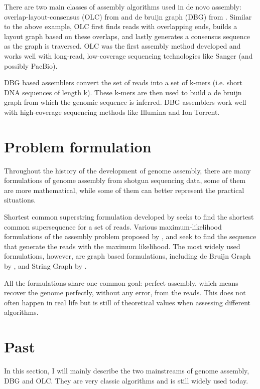 \documentclass{bioinfo}
\begin{document}
There are two main classes of assembly algorithms used in de novo assembly:  overlap-layout-consensus (OLC) from \cite{myers2005fragment} and de bruijn graph (DBG) from \cite{zerbino2008velvet} . Similar to the above example, OLC first finds reads with overlapping ends, builds a layout graph based on these overlaps, and lastly generates a consensus sequence as the graph is traversed.  OLC was the first assembly method developed and works well with long-read, low-coverage sequencing technologies like Sanger (and possibly PacBio).

DBG based assemblers convert the set of reads into a set of k-mers (i.e. short DNA sequences of length k).  These k-mers are then used to build a de bruijn graph from which the genomic sequence is inferred.  DBG assemblers work well with high-coverage sequencing methods like Illumina and Ion Torrent.  

\section{Problem formulation}

Throughout the history of the development of genome assembly, there are many formulations of genome assembly from shotgun sequencing data, some of them are more mathematical, while some of them can better represent the practical situations.

Shortest common superstring formulation developed by \cite{kececioglu1995combinatorial} seeks to find the shortest common supersequence for a set of reads. Various maximum-likelihood formulations of the assembly problem proposed by \cite{myers1995toward}, and \cite{medvedev2009maximum} seek to find the sequence that generate the reads with the maximum likelihood. The most widely used formulations, however, are graph based formulations, including de Bruijn Graph by \cite{pevzner2001eulerian}, and String Graph by \cite{myers2005fragment}. 

All the formulations share one common goal: perfect assembly, which means recover the genome perfectly, without any error, from the reads. This does not often happen in real life but is still of theoretical values when assessing different algorithms.


\section{Past}
In this section, I will mainly describe the two mainstreams of genome assembly, DBG and OLC. They are very classic algorithms and is still widely used today. 
\end{document}
